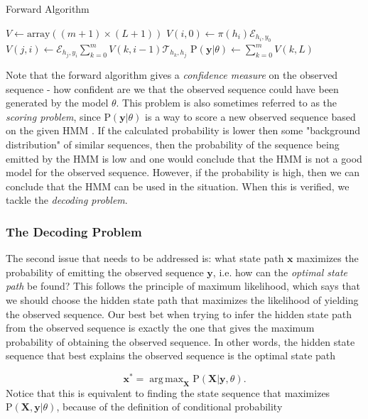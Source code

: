 \documentclass{article}
\DeclareMathOperator*{\argmax}{arg\,max}
\begin{document}
\begin{algorithm}
    \caption{Forward Algorithm}\label{alg:Forward}
    \begin{algorithmic}
        \STATE $V \gets \text{array}((m+1) \times (L+1))$
            \STATE $V(i,0) \gets \pi(h_{i}) \mathcal{E}_{h_{i},y_0}$
        \ENDFOR
                \STATE $V(j,i) \gets \mathcal{E}_{h_{j}, y_i}\sum_{k=0}^{m}V(k, i-1)\mathcal{T}_{h_{k},h_{j}} $
            \ENDFOR
        \ENDFOR
        \RETURN $\text{P}(\mathbf{y}|\theta) \gets \sum_{k=0}^{m}V(k,L)$
    \end{algorithmic} 
\end{algorithm}

Note that the forward algorithm gives a \textit{confidence measure} on the observed sequence - how confident are we that the observed sequence could have been generated by the model $\theta$. This problem is also sometimes referred to as the \textit{scoring problem}, since $\text{P}(\mathbf{y}|\theta)$ is a way to score a new observed sequence based on the given HMM \cite{Yoon2009}. If the calculated probability is lower then some "background distribution" of similar sequences, then the probability of the sequence being emitted by the HMM is low and one would conclude that the HMM is not a good model for the observed sequence. However, if the probability is high, then we can conclude that the HMM can be used in the situation. When this is verified, we tackle the \textit{decoding problem}.

\subsubsection{The Decoding Problem}
The second issue that needs to be addressed is: what state path $\mathbf{x}$ maximizes the probability of emitting the observed sequence $\mathbf{y}$, i.e. how can the \textit{optimal state path} be found? This follows the principle of maximum likelihood, which says that we should choose the hidden state path that maximizes the likelihood of yielding the observed sequence. Our best bet when trying to infer the hidden state path from the observed sequence is exactly the one that gives the maximum probability of obtaining the observed sequence. In other words, the hidden state sequence that best explains the observed sequence is the optimal state path

\begin{equation}
    \mathbf{x^*} = \argmax_\mathbf{X} \text{P}(\mathbf{X}|\mathbf{y}, \theta).
    \label{optimalStatePath}
\end{equation}
Notice that this is equivalent to finding the state sequence that maximizes $\text{P}(\mathbf{X}, \mathbf{y}|\theta)$, because of the definition of conditional probability  
\end{document}
